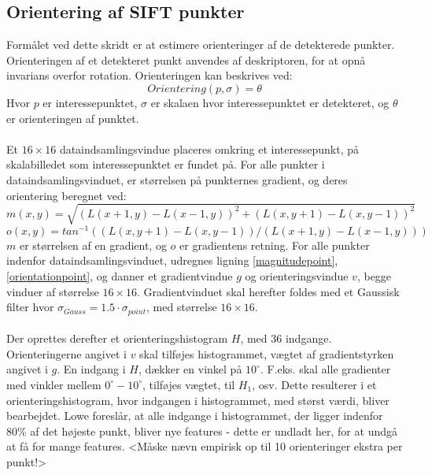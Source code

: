 \subsection{Orientering af SIFT punkter}
Formålet ved dette skridt er at estimere orienteringer af de detekterede punkter.
Orienteringen af et detekteret punkt anvendes af deskriptoren, for at opnå invarians overfor rotation. Orienteringen kan beskrives ved:
\begin{equation}
Orientering(p, \sigma) = \theta
\end{equation}
Hvor $p$ er interessepunktet, $\sigma$ er skalaen hvor interessepunktet er detekteret, og $\theta$ er orienteringen af punktet. 
\\
\\
Et $16\times16$ dataindsamlingsvindue placeres omkring et interessepunkt, på skalabilledet som interessepunktet er fundet på. For alle punkter i dataindsamlingsvinduet, er størrelsen på punkternes gradient, og deres orientering beregnet ved:
\begin{equation}
m(x,y) = \sqrt{(L(x + 1, y) - L(x - 1, y))^2 + (L(x, y + 1) - L(x, y - 1))^2} 
\label{magnitudepoint}
\end{equation}
\begin{equation}o(x,y) = tan^{-1}((L(x,y+1) - L(x,y-1))/(L(x+1, y) - L(x-1, y))) 
\label{orientationpoint}
\end{equation}
$m$ er størrelsen af en gradient, og $o$ er gradientens retning. For alle punkter indenfor dataindsamlingsvinduet, udregnes ligning
\eqref{magnitudepoint}, \eqref{orientationpoint}, og danner et gradientvindue $g$ og orienteringsvindue $v$, begge vinduer af størrelse $16\times16$. Gradientvinduet skal herefter foldes med et Gaussisk filter hvor $\sigma_{Gauss} = 1.5 \cdot \sigma_{point}$, med størrelse $16\times16$.
\\
\\
Der oprettes derefter et orienteringshistogram $H$, med 36 indgange. Orienteringerne angivet i $v$ skal tilføjes histogrammet, vægtet af gradientstyrken angivet i $g$. En indgang i $H$, dækker en vinkel på $10^{\circ}$. F.eks. skal alle gradienter med vinkler mellem  $0^{\circ}-10^{\circ}$, tilføjes vægtet, til $H_1$, osv. Dette resulterer i et orienteringshistogram, hvor indgangen i histogrammet, med størst værdi, bliver bearbejdet. Lowe foreslår, at alle indgange i histogrammet, der ligger indenfor 80\% af det højeste punkt, bliver nye features - dette er undladt her, for at undgå at få for mange features. <Måske nævn empirisk op til 10 orienteringer ekstra per punkt!>
